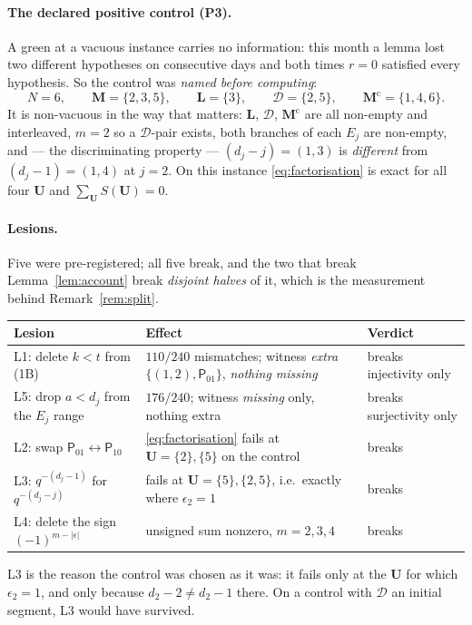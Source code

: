 \documentclass[11pt]{article}
\theoremstyle{plain}
\theoremstyle{definition}
\theoremstyle{remark}
\newcommand{\bM}{\mathbf M}
\newcommand{\bL}{\mathbf L}
\newcommand{\bU}{\mathbf U}
\newcommand{\cD}{\mathcal D}
\newcommand{\cm}{{\mathrm c}}
\begin{document}
\paragraph{The declared positive control (P3).}
A green at a vacuous instance carries no information: this month a lemma lost two
different hypotheses on consecutive days and both times $r=0$ satisfied every
hypothesis. So the control was \emph{named before computing}:
\[
N=6,\qquad \bM=\{2,3,5\},\qquad \bL=\{3\},\qquad
\cD=\{2,5\},\qquad \bM^\cm=\{1,4,6\}.
\]
It is non-vacuous in the way that matters: $\bL$, $\cD$, $\bM^\cm$ are all
non-empty and interleaved, $m=2$ so a $\cD$-pair exists, both branches of each
$E_j$ are non-empty, and --- the discriminating property --- $(d_j-j)=(1,3)$ is
\emph{different} from $(d_j-1)=(1,4)$ at $j=2$. On this instance
\eqref{eq:factorisation} is exact for all four $\bU$ and
$\sum_{\bU}S(\bU)=0$.

\paragraph{Lesions.} Five were pre-registered; all five break, and the two that
break Lemma~\ref{lem:account} break \emph{disjoint halves} of it, which is the
measurement behind Remark~\ref{rem:split}.
\begin{center}
\small
\begin{tabular}{lll}
\hline
\textbf{Lesion} & \textbf{Effect} & \textbf{Verdict}\\
\hline
L1: delete $k<t$ from (1B) & $110/240$ mismatches; witness
  \emph{extra} $\{(1,2),\mathsf P_{01}\}$, \emph{nothing missing} & breaks injectivity only\\
L5: drop $a<d_j$ from the $E_j$ range & $176/240$; witness \emph{missing} only,
  nothing extra & breaks surjectivity only\\
L2: swap $\mathsf P_{01}\leftrightarrow\mathsf P_{10}$ & \eqref{eq:factorisation}
  fails at $\bU=\{2\},\{5\}$ on the control & breaks\\
L3: $q^{-(d_j-1)}$ for $q^{-(d_j-j)}$ & fails at $\bU=\{5\},\{2,5\}$, i.e.\ exactly
  where $\epsilon_2=1$ & breaks\\
L4: delete the sign $(-1)^{m-|\epsilon|}$ & unsigned sum nonzero, $m=2,3,4$ & breaks\\
\hline
\end{tabular}
\end{center}
L3 is the reason the control was chosen as it was: it fails only at the $\bU$ for
which $\epsilon_2=1$, and only because $d_2-2\ne d_2-1$ there. On a control with
$\cD$ an initial segment, L3 would have survived.
\end{document}
